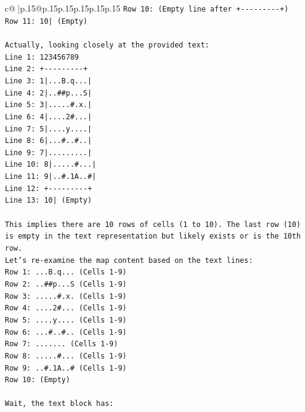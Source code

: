 \documentclass{article}
\begin{document}
{\begin{supertabular}{c@{$\;$}|p{.15\linewidth}@{}p{.15\linewidth}p{.15\linewidth}p{.15\linewidth}p{.15\linewidth}p{.15\linewidth}}
{{{\texttt{Row 10: (Empty line after +{-}{-}{-}{-}{-}{-}{-}{-}{-}+)} \\
\texttt{Row 11: 10| (Empty)} \\
\\ 
\texttt{Actually, looking closely at the provided text:} \\
\texttt{Line 1: 123456789} \\
\texttt{Line 2: +{-}{-}{-}{-}{-}{-}{-}{-}{-}+} \\
\texttt{Line 3: 1|...B.q...|} \\
\texttt{Line 4: 2|..\#\#p...S|} \\
\texttt{Line 5: 3|.....\#.x.|} \\
\texttt{Line 6: 4|....2\#...|} \\
\texttt{Line 7: 5|....y....|} \\
\texttt{Line 8: 6|...\#..\#..|} \\
\texttt{Line 9: 7|.........|} \\
\texttt{Line 10: 8|.....\#...|} \\
\texttt{Line 11: 9|..\#.1A..\#|} \\
\texttt{Line 12: +{-}{-}{-}{-}{-}{-}{-}{-}{-}+} \\
\texttt{Line 13: 10| (Empty)} \\
\\ 
\texttt{This implies there are 10 rows of cells (1 to 10). The last row (10) is empty in the text representation but likely exists or is the 10th row.} \\
\texttt{Let's re{-}examine the map content based on the text lines:} \\
\texttt{Row 1: ...B.q... (Cells 1{-}9)} \\
\texttt{Row 2: ..\#\#p...S (Cells 1{-}9)} \\
\texttt{Row 3: .....\#.x. (Cells 1{-}9)} \\
\texttt{Row 4: ....2\#... (Cells 1{-}9)} \\
\texttt{Row 5: ....y.... (Cells 1{-}9)} \\
\texttt{Row 6: ...\#..\#.. (Cells 1{-}9)} \\
\texttt{Row 7: ....... (Cells 1{-}9)} \\
\texttt{Row 8: .....\#... (Cells 1{-}9)} \\
\texttt{Row 9: ..\#.1A..\# (Cells 1{-}9)} \\
\texttt{Row 10: (Empty)} \\
\\ 
\texttt{Wait, the text block has:} \\
}}}
\end{supertabular}}
\end{document}
